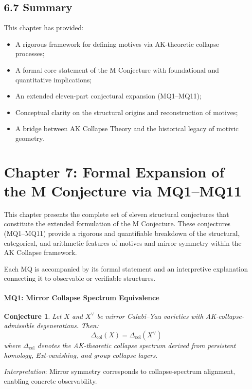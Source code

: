\documentclass[11pt]{article}
\newtheorem{conjecture}{Conjecture}[section]
\begin{document}
\subsection{6.7 Summary}

This chapter has provided:

\begin{itemize}
    \item A rigorous framework for defining motives via AK-theoretic collapse processes;
    \item A formal core statement of the M Conjecture with foundational and quantitative implications;
    \item An extended eleven-part conjectural expansion (MQ1–MQ11);
    \item Conceptual clarity on the structural origins and reconstruction of motives;
    \item A bridge between AK Collapse Theory and the historical legacy of motivic geometry.
\end{itemize}

\FloatBarrier




\section{Chapter 7: Formal Expansion of the M Conjecture via MQ1--MQ11}

This chapter presents the complete set of eleven structural conjectures that constitute the extended formulation of the M Conjecture. These conjectures (MQ1–MQ11) provide a rigorous and quantifiable breakdown of the structural, categorical, and arithmetic features of motives and mirror symmetry within the AK Collapse framework.

Each MQ is accompanied by its formal statement and an interpretive explanation connecting it to observable or verifiable structures.

\bigskip

\paragraph{MQ1: Mirror Collapse Spectrum Equivalence}
\begin{conjecture}
Let $X$ and $X^{\vee}$ be mirror Calabi--Yau varieties with AK-collapse-admissible degenerations. Then:
\[
\Delta_{\mathrm{col}}(X) = \Delta_{\mathrm{col}}(X^{\vee})
\]
where $\Delta_{\mathrm{col}}$ denotes the AK-theoretic collapse spectrum derived from persistent homology, Ext-vanishing, and group collapse layers.
\end{conjecture}
\textit{Interpretation}: Mirror symmetry corresponds to collapse-spectrum alignment, enabling concrete observability.
\end{document}
